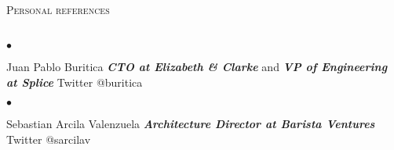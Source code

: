 \documentclass[a4paper]{article}
\newcommand{\lineunder}{\vspace*{-8pt} \\ \hspace*{-18pt} \hrulefill \\}
\newcommand{\header}[1]{{\hspace*{-15pt}\vspace*{6pt}
\textsc{#1}} \vspace*{-6pt} \lineunder}
\newcommand{\employer}[3]{{
\textbf{#1} (#2)\\ \underline{\textbf{\emph{#3}}}\\ }}
\newenvironment{achievements}{\begin{list}{$\bullet$}{\topsep 0pt \itemsep
-2pt}}{\vspace*{4pt}\end{list}}
\newcommand{\emphasys}[1]{\textbf{\emph{#1}}}
\begin{document}

\header{Personal references}
\begin{achievements}
\item{Juan Pablo Buritica \emphasys{CTO at Elizabeth \& Clarke} and \emphasys{VP of Engineering at Splice} Twitter @buritica}
\end{achievements}
\begin{achievements}
\item{Sebastian Arcila Valenzuela \emphasys{Architecture Director at Barista Ventures} Twitter @sarcilav}
\end{achievements}
\end{document}

